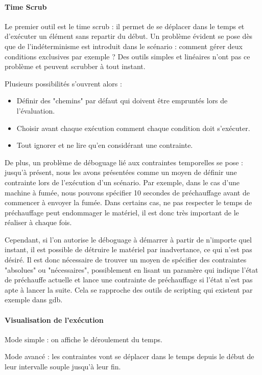 \documentclass{sigchi}
\begin{document}
\paragraph{Time Scrub}
Le premier outil est le time scrub : il permet de se déplacer dans le temps et d'exécuter un élément sans repartir du début. Un problème évident se pose dès que de l'indéterminisme est introduit dans le scénario : comment gérer deux conditions exclusives par exemple ? Des outils simples et linéaires n'ont pas ce problème et peuvent scrubber à tout instant.

Plusieurs possibilités s'ouvrent alors :
\begin{itemize}
    \item Définir des "chemins" par défaut qui doivent être empruntés lors de l'évaluation.
    \item Choisir avant chaque exécution comment chaque condition doit s'exécuter.
    \item Tout ignorer et ne lire qu'en considérant une contrainte.
\end{itemize}

De plus, un problème de déboguage lié aux contraintes temporelles se pose : jusqu'à présent, nous les avons présentées comme un moyen de définir une contrainte lors de l'exécution d'un scénario. Par exemple, dans le cas d'une machine à fumée, nous pouvons spécifier 10 secondes de préchauffage avant de commencer à envoyer la fumée. Dans certains cas, ne pas respecter le temps de préchauffage peut endommager le matériel, il est donc très important de le réaliser à chaque fois.

Cependant, si l'on autorise le déboguage à démarrer à partir de n'importe quel instant, il est possible de détruire le matériel par inadvertance, ce qui n'est pas désiré. Il est donc nécessaire de trouver un moyen de spécifier des contraintes "absolues" ou "nécessaires", possiblement en lisant un paramère qui indique l'état de préchauffe actuelle et lance une contrainte de préchauffage si l'état n'est pas apte à lancer la suite. Cela se rapproche des outils de scripting qui existent par exemple dans gdb.

\paragraph{Visualisation de l'exécution}
Mode simple : on affiche le déroulement du temps.

Mode avancé : les contraintes vont se déplacer dans le temps depuis le début de leur intervalle souple jusqu'à leur fin.
\end{document}
